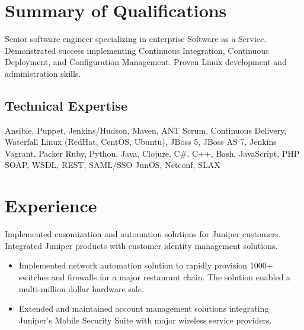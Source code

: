 \documentclass[12pt,letter,sans]{moderncv}
\begin{document}
\makecvtitle

\section{Summary of Qualifications}

Senior software engineer specializing in enterprise Software as a
Service. Demonstrated success implementing Continuous Integration, Continuous
Deployment, and Configuration Management.  Proven Linux development
and administration skills.

\subsection{Technical Expertise}

 { Ansible, Puppet, Jenkins/Hudson, Maven, ANT }
 { Scrum, Continuous Delivery, Waterfall }
 { Linux (RedHat, CentOS, Ubuntu), JBoss 5, JBoss AS 7, Jenkins }
 { Vagrant, Packer }
 { Ruby, Python, Java, Clojure, C\#, C++, Bash, JavaScript, PHP }
 { SOAP, WSDL, REST, SAML/SSO }
 { JunOS, Netconf, SLAX }

\section{Experience}


Implemented cusomization and automation solutions for Juniper
customers.  Integrated Juniper products with customer identity
management solutions.  

\begin{itemize}
  \item Implemented network automation solution to rapidly provision
    1000+ switches and firewalls for a major restaurant chain.  The
    solution enabled a multi-million dollar hardware sale.

  \item Extended and maintained account management solutions
    integrating Juniper's Mobile Security Suite with major wireless
    service providers.

\end{itemize}

\end{document}
